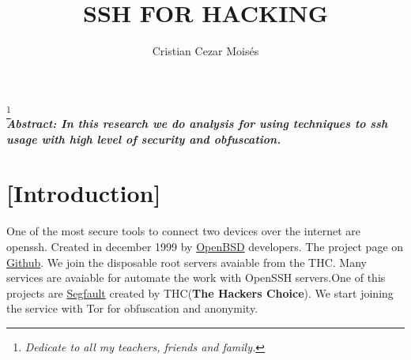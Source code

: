 \documentclass[english,12pt,a4paper,twoside,openright,openany,onecolumn,titlepage,openbib,leqno,fleqn]{article}
\begin{document}
	\title{SSH FOR HACKING}
	\author{Cristian Cezar Moisés}
	\maketitle
	\thanks{\textit{Dedicate to all my teachers, friends and family.}}
	\\
	\tableofcontents
	\newpage
	\emph {\textbf{Abstract: In this research we do analysis for using techniques to ssh usage with high level of security and obfuscation.}}
	\centering
	\section {[Introduction]}
	\raggedright
	\textnormal{One of the most secure tools to connect two devices over the internet are openssh. Created in december 1999 by \href{https://openbsd.org}{OpenBSD} developers.}
	\cite[OpenSSH is a derivative of the original free ssh 1.2.12 release from Tatu Ylönen. That version was the last one free enough for reuse. Parts of OpenSSH still bear Tatu's license, which was contained in that release. That version, and earlier ones, used mathematical functions from the libgmp library, which was directly included at the time. It is now made available under the Lesser GNU Public License, but versions of that era were under the regular GNU Public License.]{openssh} 
	\textnormal {The project page on \href{https://github.com/openssh/openssh-portable}{Github}. We join the disposable root servers avaiable from the THC. Many services are avaiable for automate the work with OpenSSH servers.One of this projects are \href{https://www.thc.org/segfault/}{Segfault} created by THC(\textbf{The Hackers Choice}). We start joining the service with Tor for obfuscation and anonymity.}
	\newpage
	\centering
\end{document}
